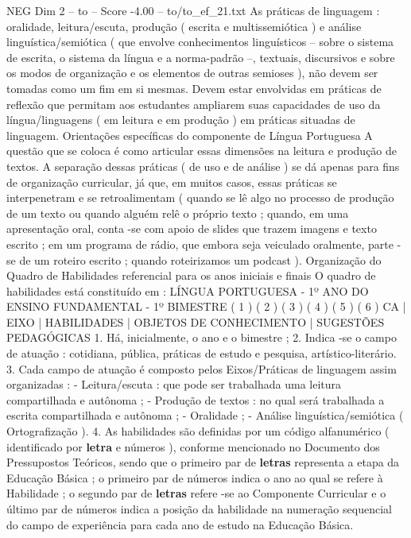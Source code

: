 \begin{textsample}{NEG Dim 2 – to – Score -4.00 – to/to\_ef\_21.txt}  \label{ex:f2_neg_156}
As práticas de linguagem : oralidade, leitura/escuta, produção ( escrita e multissemiótica ) e análise linguística/semiótica ( que envolve conhecimentos linguísticos – sobre o sistema de escrita, o sistema da língua e a norma-padrão –, textuais, discursivos e sobre os modos de organização e os elementos de outras semioses ), não devem ser tomadas como um fim em si mesmas.
Devem estar envolvidas em práticas de reflexão que permitam aos estudantes ampliarem suas capacidades de uso da língua/linguagens ( em leitura e em produção ) em práticas situadas de linguagem.
Orientações específicas do componente de Língua Portuguesa A questão que se coloca é como articular essas dimensões na leitura e produção de textos.
A separação dessas práticas ( de uso e de análise ) se dá apenas para fins de organização curricular, já que, em muitos casos, essas práticas se interpenetram e se retroalimentam ( quando se lê algo no processo de produção de um texto ou quando alguém relê o próprio texto ; quando, em uma apresentação oral, conta -se com apoio de slides que trazem imagens e texto escrito ; em um programa de rádio, que embora seja veiculado oralmente, parte -se de um roteiro escrito ; quando roteirizamos um podcast ).
Organização do Quadro de Habilidades referencial para os anos iniciais e finais O quadro de habilidades está constituído em : LÍNGUA PORTUGUESA - 1º ANO DO ENSINO FUNDAMENTAL - 1º BIMESTRE ( 1 ) ( 2 ) ( 3 ) ( 4 ) ( 5 ) ( 6 ) CA | EIXO | HABILIDADES | OBJETOS DE CONHECIMENTO | SUGESTÕES PEDAGÓGICAS 1.
Há, inicialmente, o ano e o bimestre ; 2.
Indica -se o campo de atuação : cotidiana, pública, práticas de estudo e pesquisa, artístico-literário. 3.
Cada campo de atuação é composto pelos Eixos/Práticas de linguagem assim organizadas : - Leitura/escuta : que pode ser trabalhada uma leitura compartilhada e autônoma ; - Produção de textos : no qual será trabalhada a escrita compartilhada e autônoma ; - Oralidade ; - Análise linguística/semiótica ( Ortografização ). 4.
As habilidades são definidas por um código alfanumérico ( identificado por \textbf{letra} e números ), conforme mencionado no Documento dos Pressupostos Teóricos, sendo que o primeiro par de \textbf{letras} representa a etapa da Educação Básica ; o primeiro par de números indica o ano ao qual se refere à Habilidade ; o segundo par de \textbf{letras} refere -se ao Componente Curricular e o último par de números indica a posição da habilidade na numeração sequencial do campo de experiência para cada ano de estudo na Educação Básica.

\end{textsample}
